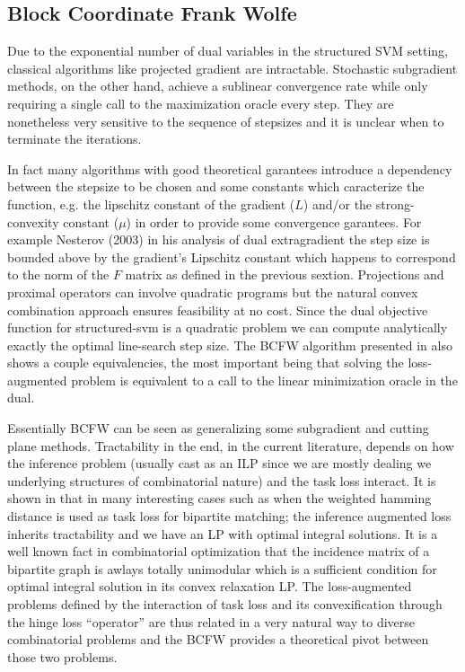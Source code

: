 \subsection{Block Coordinate Frank Wolfe}
Due to the exponential number of dual variables in the structured SVM setting,
classical algorithms like projected gradient are intractable. Stochastic
subgradient methods, on the other hand, achieve a sublinear convergence rate
while only requiring a single call to the maximization oracle every step. They
are nonetheless very sensitive to the sequence of stepsizes and it is unclear
when to terminate the iterations. 

In fact many algorithms with good theoretical garantees introduce a dependency
between the stepsize to be chosen and some constants which caracterize the
function, e.g. the lipschitz constant of the gradient ($L$) and/or the
strong-convexity constant ($\mu$) in order to provide some convergence
garantees. For example Nesterov (2003) in his analysis of dual extragradient the
step size is bounded above by the gradient's Lipschitz constant which happens to
correspond to the norm of the $F$ matrix as defined in the previous sextion.
Projections and proximal operators can involve quadratic programs but the
natural convex combination approach ensures feasibility at no cost. Since the
dual objective function for structured-svm is a quadratic problem we can compute
analytically exactly the optimal line-search step size. The BCFW algorithm
presented in \citet{lacoste-julienBlockCoordinateFrankWolfeOptimization2013}
also shows a couple equivalencies, the most important being that solving the
loss-augmented problem is equivalent to a call to the linear minimization oracle
in the dual.

Essentially BCFW can be seen as generalizing some subgradient and cutting plane
methods. Tractability in the end, in the current literature, depends on how the
inference problem (usually cast as an ILP since we are mostly dealing we
underlying structures of combinatorial nature) and the task loss interact. It is
shown in \cite{taskarStructuredPredictionDual2006} that in many interesting
cases such as when the weighted hamming distance is used as task loss for
bipartite matching; the inference augmented loss inherits tractability and we
have an LP with optimal integral solutions. It is a well known fact in
combinatorial optimization that the incidence matrix of a bipartite graph is
awlays totally unimodular which is a sufficient condition for optimal integral
solution in its convex relaxation LP. The loss-augmented problems defined by the
interaction of task loss and its convexification through the hinge loss
``operator'' are thus related in a very natural way to diverse combinatorial
problems and the BCFW provides a theoretical pivot between those two problems.

